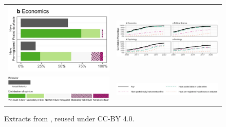 \documentclass{article}
\begin{document}
\begin{figure}
    \centering
    \begin{tabular}{cc}
    \includegraphics[width=0.30\linewidth]{data/christensen-2019-fig1b.png}

    &  
    \includegraphics[width=0.65\linewidth]{data/christensen-2019-fig7.png}
    \\
    \includegraphics[width=0.30\linewidth]{data/christensen-2019-fig1-legend.png}
         &  
    \includegraphics[width=0.5\linewidth]{data/christensen-2019-fig7-legend.png}
    \\
    \end{tabular}
    \caption{Extracts from \citet[Figures 1 and 7]{ferguson_survey_2023}, reused under CC-BY 4.0.}
    \label{fig:christensen-fig1b}
\end{figure}


\end{document}
